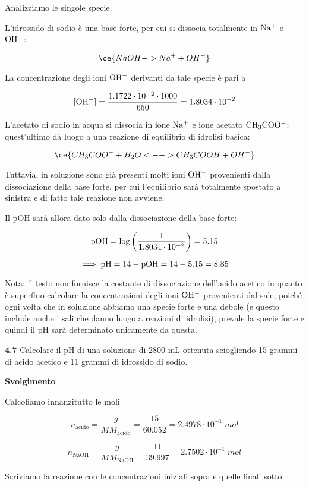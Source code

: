 Analizziamo le singole specie.

L'idrossido di sodio è una base forte, per cui si dissocia totalmente in $\rm Na^+$ e $\rm OH^-$:

$$\ce{NaOH -> Na^+ + OH^-}$$

La concentrazione degli ioni $\rm OH^-$ derivanti da tale specie è pari a

$$[\rm OH^-]=\frac{1.1722 \cdot 10^{-2} \cdot 1000}{650}=1.8034 \cdot 10^{-2}$$

L'acetato di sodio in acqua si dissocia in ione $\rm Na^+$ e ione acetato $\rm CH_3COO^-$; quest'ultimo dà luogo a una reazione di equilibrio di idrolisi basica:

$$\ce{CH_3COO^- + H_2O <--> CH_3COOH + OH^-}$$

Tuttavia, in soluzione sono già presenti molti ioni $\rm OH^-$ provenienti dalla dissociazione della base forte, per cui l'equilibrio sarà totalmente spostato a sinistra e di fatto tale reazione non avviene.

Il pOH sarà allora dato solo dalla dissociazione della base forte:

$$\rm pOH=\log{\left(\frac{1}{1.8034 \cdot 10^{-2}}\right)}=5.15$$

$$\implies \rm pH=14-pOH=14-5.15=8.85$$

Nota: il testo non fornisce la costante di dissociazione dell'acido acetico in quanto è superfluo calcolare la concentrazioni degli ioni $\rm OH^-$ provenienti dal sale, poiché ogni volta che in soluzione abbiamo una specie forte e una debole (e questo include anche i sali che danno luogo a reazioni di idrolisi), prevale la specie forte e quindi il pH sarà determinato unicamente da questa.

\vspace{0.2cm}\textbf{4.7} Calcolare il pH di una soluzione di 2800 mL ottenuta sciogliendo 15 grammi di acido acetico e 11 grammi di idrossido di sodio.

\vspace{0.2cm}\large\textbf{Svolgimento}\normalsize

\vspace{0.2cm}Calcoliamo innanzitutto le moli

$$n_{\text{acido}}=\frac{g}{MM_{\text{acido}}}=\frac{15}{60.052}=2.4978 \cdot 10^{-1}\;mol$$

$$n_{\text{NaOH}}=\frac{g}{MM_{\text{NaOH}}}=\frac{11}{39.997}=2.7502 \cdot 10^{-1}\;mol$$

Scriviamo la reazione con le concentrazioni iniziali sopra e quelle finali sotto:

